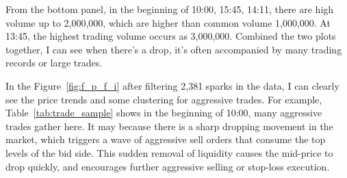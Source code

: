 From the bottom panel, in the beginning of 10:00, 15:45, 14:11, there are high volume up to 2,000,000, which are higher than common volume 1,000,000. At 13:45, the highest trading volume occurs as 3,000,000. Combined the two plots together, I can see when there's a drop, it's often accompanied by many trading records or large trades. 

In the Figure~\ref{fig:f_p_f_i} after filtering 2,381 sparks in the data, I can clearly see the price trends and some clustering for aggressive trades. For example, Table~\ref{tab:trade_sample} shows in the beginning of 10:00, many aggressive trades gather here. It may because there is a sharp dropping movement in the market, which triggers a wave of aggressive sell orders that consume the top levels of the bid side. This sudden removal of liquidity causes the mid-price to drop quickly, and encourages further aggressive selling or stop-loss execution.  


